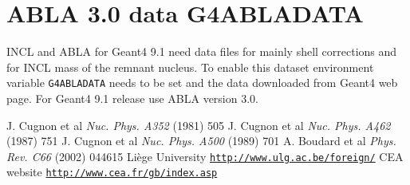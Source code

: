 \documentclass[12pt,a4paper]{article}
\begin{document}
\section{ABLA 3.0 data G4ABLADATA}

INCL and ABLA for Geant4 9.1 need data files for mainly shell
corrections and for INCL mass of the remnant nucleus. To enable this
dataset environment variable {\tt G4ABLADATA} needs to be set and the
data downloaded from Geant4 web page. For Geant4 9.1 release use ABLA
version 3.0.

\begin{thebibliography}{99}
 J. Cugnon et al \emph{Nuc. Phys. A352} (1981) 505
 J. Cugnon et al \emph{Nuc. Phys. A462} (1987) 751
 J. Cugnon et al \emph{Nuc. Phys. A500} (1989) 701
 A. Boudard et al \emph{Phys. Rev. C66} (2002) 044615
 Li\`ege University
\href{http://www.ulg.ac.be/foreign/}{{\tt http://www.ulg.ac.be/foreign/}}
 CEA website
  \href{http://www.cea.fr/gb/index.asp}{{\tt http://www.cea.fr/gb/index.asp}}
\end{thebibliography}
\end{document}

